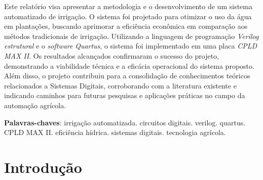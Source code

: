 \documentclass[
	article,			%
	11pt,				%
	oneside,			%
	a4paper,			%
	english,			%
	brazil,				%
	sumario=tradicional
	]{abntex2}
\begin{document}
\frenchspacing 


%
%
\maketitle

\begin{resumoumacoluna}
 Este relatório visa apresentar a metodologia e o desenvolvimento de um sistema automatizado de irrigação. O sistema foi projetado para otimizar o uso da água em plantações, buscando aprimorar a eficiência econômica em comparação aos métodos tradicionais de irrigação. Utilizando a linguagem de programação \textit{Verilog estrutural} e o \textit{software} \textit{Quartus}, o sistema foi implementado em uma placa \textit{CPLD MAX II}. Os resultados alcançados confirmaram o sucesso do projeto, demonstrando a viabilidade técnica e a eficácia operacional do sistema proposto. Além disso, o projeto contribuiu para a consolidação de conhecimentos teóricos relacionados a Sistemas Digitais, corroborando com a literatura existente e indicando caminhos para futuras pesquisas e aplicações práticas no campo da automação agrícola.
 
 \vspace{\onelineskip}
 
 \noindent
 \textbf{Palavras-chaves}: irrigação automatizada. circuitos digitais. verilog. quartus. CPLD MAX II. eficiência hídrica. sistemas digitais. tecnologia agrícola.
\end{resumoumacoluna}


\textual

\section*{Introdução}
\end{document}
